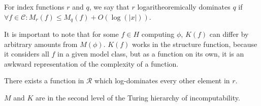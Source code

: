 \documentclass{style/llncs}
\newcommand{\C}{{\mathscr C}}
\newcommand{\R}{{\mathscr R}}
\begin{document}
\begin{definition}
For index functions $r$ and $q$, we say that $r$ logaritheoremically dominates $q$ if $\forall f \in \C: M_r(f) \leq M_q(f) + O(\log(|x|))$.
\end{definition}

It is important to note that for some $f \in H$ computing $\phi$, $K(f)$ can differ by arbitrary amounts from $M(\phi)$. $K(f)$ works in the structure function, because it considers all $f$ in a given model class, but as a function on its own, it is an awkward representation of the complexity of a function.

\begin{theorem}
There exists a function in $\R$ which log-dominates every other element in $r$. 
\end{theorem}

\begin{theorem}
$M$ and $K$ are in the second level of the Turing hierarchy of incomputability. 
\end{theorem}

\begin{theorem}
\cite{DBLP:journals/cj/Shen99}

\end{theorem}


\end{document}
